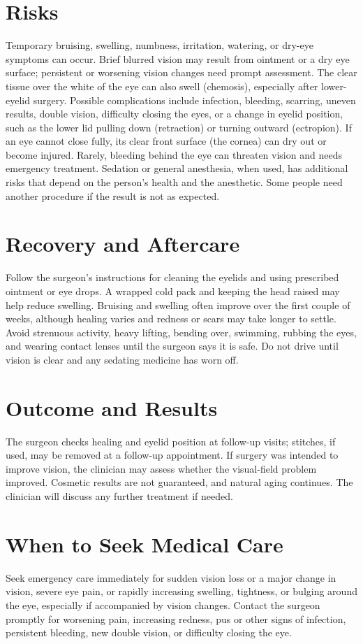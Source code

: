 \section*{Risks}
Temporary bruising, swelling, numbness, irritation, watering, or dry-eye symptoms can occur. Brief blurred vision may result from ointment or a dry eye surface; persistent or worsening vision changes need prompt assessment. The clear tissue over the white of the eye can also swell (chemosis), especially after lower-eyelid surgery. Possible complications include infection, bleeding, scarring, uneven results, double vision, difficulty closing the eyes, or a change in eyelid position, such as the lower lid pulling down (retraction) or turning outward (ectropion). If an eye cannot close fully, its clear front surface (the cornea) can dry out or become injured. Rarely, bleeding behind the eye can threaten vision and needs emergency treatment. Sedation or general anesthesia, when used, has additional risks that depend on the person's health and the anesthetic. Some people need another procedure if the result is not as expected.

\section*{Recovery and Aftercare}
Follow the surgeon's instructions for cleaning the eyelids and using prescribed ointment or eye drops. A wrapped cold pack and keeping the head raised may help reduce swelling. Bruising and swelling often improve over the first couple of weeks, although healing varies and redness or scars may take longer to settle. Avoid strenuous activity, heavy lifting, bending over, swimming, rubbing the eyes, and wearing contact lenses until the surgeon says it is safe. Do not drive until vision is clear and any sedating medicine has worn off.

\section*{Outcome and Results}
The surgeon checks healing and eyelid position at follow-up visits; stitches, if used, may be removed at a follow-up appointment. If surgery was intended to improve vision, the clinician may assess whether the visual-field problem improved. Cosmetic results are not guaranteed, and natural aging continues. The clinician will discuss any further treatment if needed.

\section*{When to Seek Medical Care}
Seek emergency care immediately for sudden vision loss or a major change in vision, severe eye pain, or rapidly increasing swelling, tightness, or bulging around the eye, especially if accompanied by vision changes. Contact the surgeon promptly for worsening pain, increasing redness, pus or other signs of infection, persistent bleeding, new double vision, or difficulty closing the eye.

